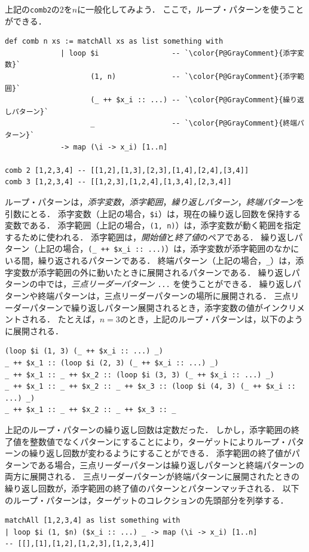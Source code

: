 上記の\lstinline{comb2}の$2$を$n$に一般化してみよう．
ここで，ループ・パターンを使うことができる．
\begin{lstlisting}[language=egison,numbers=none]
def comb n xs := matchAll xs as list something with
             | loop $i                 -- `\color{P@GrayComment}{添字変数}`
                    (1, n)             -- `\color{P@GrayComment}{添字範囲}`
                    (_ ++ $x_i :: ...) -- `\color{P@GrayComment}{繰り返しパターン}`
                    _                  -- `\color{P@GrayComment}{終端パターン}`
             -> map (\i -> x_i) [1..n]

comb 2 [1,2,3,4] -- [[1,2],[1,3],[2,3],[1,4],[2,4],[3,4]]
comb 3 [1,2,3,4] -- [[1,2,3],[1,2,4],[1,3,4],[2,3,4]]
\end{lstlisting}
ループ・パターンは，\emph{添字変数}，\emph{添字範囲}，\emph{繰り返しパターン}，\emph{終端パターン}を引数にとる．
添字変数（上記の場合，\lstinline{$i}）は，現在の繰り返し回数を保持する変数である．
添字範囲（上記の場合，\lstinline{(1, n)}）は，添字変数が動く範囲を指定するために使われる．
添字範囲は，\emph{開始値}と\emph{終了値}のペアである．
繰り返しパターン（上記の場合，\lstinline{(_ ++ $x_i :: ...)}）は，添字変数が添字範囲のなかにいる間，繰り返されるパターンである．
終端パターン（上記の場合，\lstinline{_}）は，添字変数が添字範囲の外に動いたときに展開されるパターンである．
繰り返しパターンの中では，\emph{三点リーダーパターン} \lstinline{...} を使うことができる．
繰り返しパターンや終端パターンは，三点リーダーパターンの場所に展開される．
三点リーダーパターンで繰り返しパターン展開されるとき，添字変数の値がインクリメントされる．
たとえば，$n=3$のとき，上記のループ・パターンは，以下のように展開される．
\begin{lstlisting}[language=egison]
(loop $i (1, 3) (_ ++ $x_i :: ...) _)
_ ++ $x_1 :: (loop $i (2, 3) (_ ++ $x_i :: ...) _)
_ ++ $x_1 :: _ ++ $x_2 :: (loop $i (3, 3) (_ ++ $x_i :: ...) _)
_ ++ $x_1 :: _ ++ $x_2 :: _ ++ $x_3 :: (loop $i (4, 3) (_ ++ $x_i :: ...) _)
_ ++ $x_1 :: _ ++ $x_2 :: _ ++ $x_3 :: _
\end{lstlisting}

上記のループ・パターンの繰り返し回数は定数だった．
しかし，添字範囲の終了値を整数値でなくパターンにすることにより，ターゲットによりループ・パターンの繰り返し回数が変わるようにすることができる．
添字範囲の終了値がパターンである場合，三点リーダーパターンは繰り返しパターンと終端パターンの両方に展開される．
三点リーダーパターンが終端パターンに展開されたときの繰り返し回数が，添字範囲の終了値のパターンとパターンマッチされる．
以下のループ・パターンは，ターゲットのコレクションの先頭部分を列挙する．
\begin{lstlisting}[language=egison,numbers=none]
matchAll [1,2,3,4] as list something with
| loop $i (1, $n) ($x_i :: ...) _ -> map (\i -> x_i) [1..n]
-- [[],[1],[1,2],[1,2,3],[1,2,3,4]]
\end{lstlisting}


